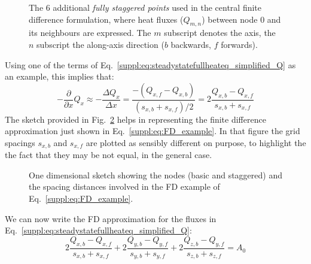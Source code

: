 \begin{figure}[ht] %
    \begin{adjustbox}{center}
    \end{adjustbox}
    \caption[Additional (staggered) points used in the central finite difference formulation.]{The 6 additional \textit{fully staggered points} used in the central finite difference formulation, where heat fluxes ($Q_{m,n}$) between node $0$ and its neighbours are expressed.
    The $m$ subscript denotes the axis, the $n$ subscript the along-axis direction ($b$ backwards, $f$ forwards).}
    \label{suppl:fig:stencil_staggered}
\end{figure}

Using one of the terms of Eq.~\ref{suppl:eq:steadystatefullheateq_simplified_Q} as an example, this implies that:
\begin{equation}
    \label{suppl:eq:FD_example}
    - \frac{\partial}{\partial x} Q_x \approx
    - \frac{\Delta Q_x}{\Delta x} =
    \frac{-(Q_{x,f} - Q_{x,b})}{(s_{x,b} + s_{x,f}) / 2} =
    2 \frac{Q_{x,b} - Q_{x,f}}{s_{x,b} + s_{x,f}}
\end{equation}
The sketch provided in Fig.~\ref{suppl:fig:stencil_sketch} helps in representing the finite difference approximation just shown in Eq.~\ref{suppl:eq:FD_example}.
In that figure the grid spacings $s_{x,b}$ and $s_{x,f}$ are plotted as sensibly different on purpose, to highlight the the fact that they may be not equal, in the general case.

\begin{figure}[ht] %
    \begin{adjustbox}{center}
    \end{adjustbox}
    \caption[Finite differences around one node, one dimensional sketch.]{One dimensional sketch showing the nodes (basic and staggered) and the spacing distances involved in the FD example of Eq.~\ref{suppl:eq:FD_example}.}
    \label{suppl:fig:stencil_sketch}
\end{figure}

We can now write the FD approximation for the fluxes in Eq.~\ref{suppl:eq:steadystatefullheateq_simplified_Q}:
\begin{equation}
    \label{suppl:eq:FD_fluxes}
    2 \frac{Q_{x,b} - Q_{x,f}}{s_{x,b} + s_{x,f}} +
    2 \frac{Q_{y,b} - Q_{y,f}}{s_{y,b} + s_{y,f}} +
    2 \frac{Q_{z,b} - Q_{y,f}}{s_{z,b} + s_{z,f}} = A_0
\end{equation}

